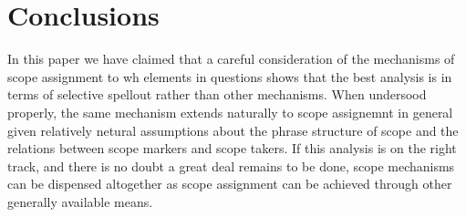 \documentclass[11pt]{article}
\begin{document}
\section{Conclusions}
In this paper we have claimed that a careful consideration of the mechanisms of scope assignment to wh elements in questions shows that the best analysis is in terms of selective spellout rather than other mechanisms.  When undersood properly, the same mechanism extends naturally to scope assignemnt in general given relatively netural assumptions about the phrase structure of scope and the relations between scope markers and scope takers.  If this analysis is on the right track, and there is no doubt a great deal remains to be done, scope mechanisms can be dispensed altogether as scope assignment can be achieved through other generally available means.


\newpage
%
\end{document}
